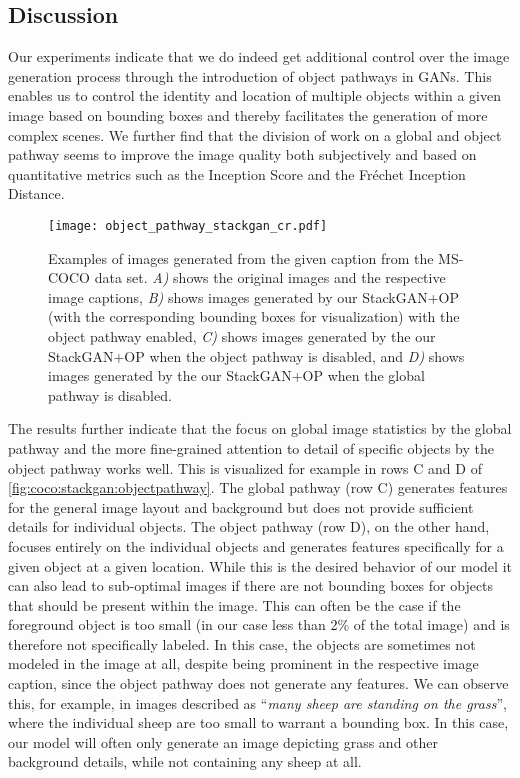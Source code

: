\documentclass{article} \usepackage{iclr2019_conference,times}
\begin{document}
	\subsection{Discussion}\label{discussion}
Our experiments indicate that we do indeed get additional control over the image generation process through the introduction of object pathways in GANs.
	This enables us to control the identity and location of multiple objects within a given image based on bounding boxes and thereby facilitates the generation of more complex scenes.
	We further find that the division of work on a global and object pathway seems to improve the image quality both subjectively and based on quantitative metrics such as the Inception Score and the Fr\'{e}chet Inception Distance.
	
	\begin{figure}
		\centering
		\texttt{[image: object\_pathway\_stackgan\_cr.pdf]}
		\caption{Examples of images generated from the given caption from the MS-COCO data set. \emph{A)} shows the original images and the respective image captions, \emph{B)} shows images generated by our StackGAN+OP (with the corresponding bounding boxes for visualization) with the object pathway enabled, \emph{C)} shows images generated by the our StackGAN+OP when the object pathway is disabled, and \emph{D)} shows images generated by the our StackGAN+OP when the global pathway is disabled.}
		\label{fig:coco:stackgan:objectpathway}
	\end{figure}
	
	The results further indicate that the focus on global image statistics by the global pathway and the more fine-grained attention to detail of specific objects by the object pathway works well.
	This is visualized for example in rows C and D of \autoref{fig:coco:stackgan:objectpathway}.
	The global pathway (row C) generates features for the general image layout and background but does not provide sufficient details for individual objects.
	The object pathway (row D), on the other hand, focuses entirely on the individual objects and generates features specifically for a given object at a given location.
	While this is the desired behavior of our model it can also lead to sub-optimal images if there are not bounding boxes for objects that should be present within the image.
	This can often be the case if the foreground object is too small (in our case less than 2\% of the total image) and is therefore not specifically labeled.
	In this case, the objects are sometimes not modeled in the image at all, despite being prominent in the respective image caption, since the object pathway does not generate any features.
	We can observe this, for example, in images described as ``\emph{many sheep are standing on the grass}'', where the individual sheep are too small to warrant a bounding box.
	In this case, our model will often only generate an image depicting grass and other background details, while not containing any sheep at all.
	
\end{document}
